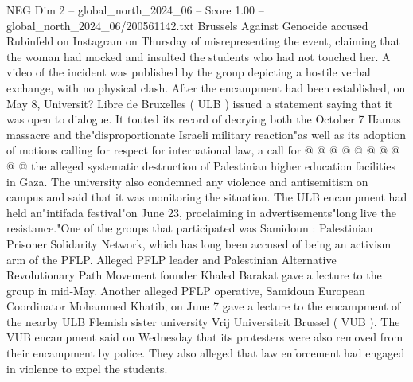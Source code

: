 \begin{textsample}{NEG Dim 2 – global\_north\_2024\_06 – Score 1.00 – global\_north\_2024\_06/200561142.txt}
Brussels Against Genocide accused Rubinfeld on Instagram on Thursday of misrepresenting the event, claiming that the woman had mocked and insulted the students who had not touched her.
A video of the incident was published by the group depicting a hostile verbal exchange, with no physical clash.
After the encampment had been established, on May 8, Universit?
Libre de Bruxelles ( ULB ) issued a statement saying that it was open to dialogue.
It touted its record of decrying both the October 7 Hamas massacre and the"disproportionate Israeli military reaction"as well as its adoption of motions calling for respect for international law, a call for @ @ @ @ @ @ @ @ @ @ the alleged systematic destruction of Palestinian higher education facilities in Gaza.
The university also condemned any violence and antisemitism on campus and said that it was monitoring the situation.
The ULB encampment had held an"intifada festival"on June 23, proclaiming in advertisements"long live the resistance."One of the groups that participated was Samidoun : Palestinian Prisoner Solidarity Network, which has long been accused of being an activism arm of the PFLP.
Alleged PFLP leader and Palestinian Alternative Revolutionary Path Movement founder Khaled Barakat gave a lecture to the group in mid-May.
Another alleged PFLP operative, Samidoun European Coordinator Mohammed Khatib, on June 7 gave a lecture to the encampment of the nearby ULB Flemish sister university Vrij Universiteit Brussel ( VUB ).
The VUB encampment said on Wednesday that its protesters were also removed from their encampment by police.
They also alleged that law enforcement had engaged in violence to expel the students.

\end{textsample}
